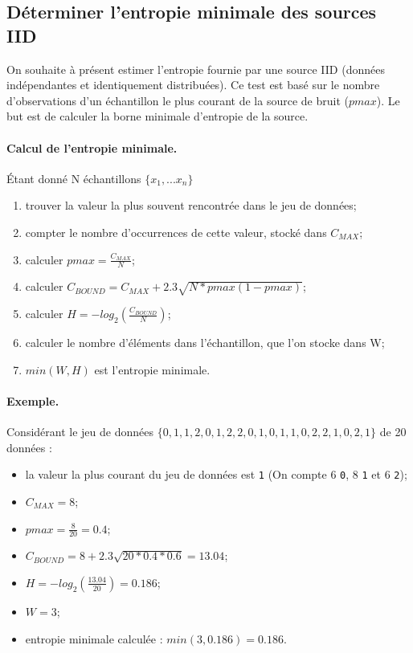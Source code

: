 \subsection{Déterminer l'entropie minimale des sources IID}
On souhaite à présent estimer l'entropie fournie par une source IID (données indépendantes et identiquement distribuées). 
Ce test est basé sur le nombre d'observations d'un échantillon le plus courant de la source de bruit ($pmax$). Le but est de calculer la borne minimale d'entropie de la source.\\

\paragraph{Calcul de l'entropie minimale.\\}
Étant donné N échantillons $\lbrace x_1, ... x_n \rbrace$
\begin{enumerate}
\item trouver la valeur la plus souvent rencontrée dans le jeu de données;
\item compter le nombre d’occurrences de cette valeur, stocké dans $C_{MAX}$;
\item calculer $pmax= \frac{C_{MAX}}{N}$;
\item calculer $C_{BOUND} = C_{MAX} + 2.3 \sqrt{N*pmax(1-pmax)} $;
\item calculer $ H = -log_2(\frac{C_{BOUND}}{N})$;
\item calculer le nombre d'éléments dans l'échantillon, que l'on stocke dans W;
\item $min(W,H)$ est l'entropie minimale.\\
\end{enumerate}


\paragraph{Exemple.\\}
Considérant le jeu de données $\lbrace 0,1,1,2,0,1,2,2,0,1,0,1,1,0,2,2,1,0,2,1 \rbrace$ de 20 données :
\begin{itemize}
\item la valeur la plus courant du jeu de données est \texttt{1} (On compte 6 \texttt{0}, 8 \texttt{1} et 6 \texttt{2});
\item $C_{MAX} = 8$;
\item $pmax = \frac{8}{20} = 0.4$;
\item $ C_{BOUND} = 8 + 2.3 \sqrt{20*0.4*0.6} = 13.04$;
\item $ H = -log_2(\frac{13.04}{20}) = 0.186$;
\item $ W = 3$;
\item entropie minimale calculée : $ min(3,0.186) = 0.186$.\\
\end{itemize}

